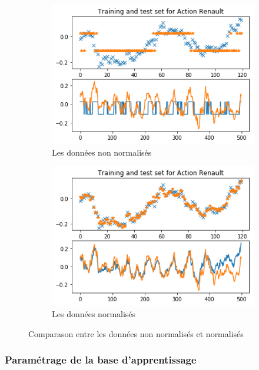 \begin{figure}[H]
\centering
\begin{subfigure}{.5\textwidth}
\centering
\includegraphics[width=.9\linewidth, scale=0.2]
{plot/non_norma.png}
\caption{Les données non normalisés}
\label{fig:Non_normalise}
\end{subfigure}%
\begin{subfigure}{.5\textwidth}
\centering
\includegraphics[width=.9\linewidth, scale=0.2]
{plot/norma.png}
\caption{Les données normalisés}
\label{fig:Normalisé}
\end{subfigure}
\caption{Comparason entre les données non normalisés et normalisés}
\label{fig: normalisation}
\end{figure}

\subsubsection{Paramétrage de la base d'apprentissage}


